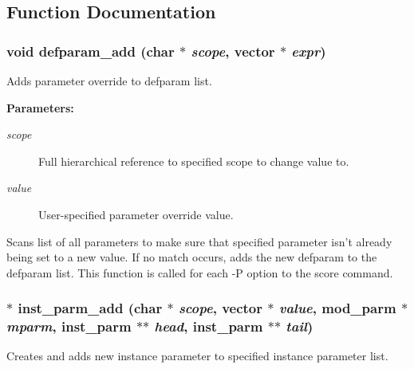 \subsection{Function Documentation}
\subsubsection{\setlength{\rightskip}{0pt plus 5cm}void defparam\_\-add (char $\ast$ {\em scope}, {\bf vector} $\ast$ {\em expr})}\label{param_8c_a10}


Adds parameter override to defparam list.

\begin{Desc}
\item[{\bf Parameters: }]\par
\begin{description}
\item[
{\em scope}]Full hierarchical reference to specified scope to change value to. \item[
{\em value}]User-specified parameter override value.

\end{description}
\end{Desc}
Scans list of all parameters to make sure that specified parameter isn't already being set to a new value. If no match occurs, adds the new defparam to the defparam list. This function is called for each -P option to the score command. 
\subsubsection{ $\ast$ inst\_\-parm\_\-add (char $\ast$ {\em scope}, {\bf vector} $\ast$ {\em value}, {\bf mod\_\-parm} $\ast$ {\em mparm}, {\bf inst\_\-parm} $\ast$$\ast$ {\em head}, {\bf inst\_\-parm} $\ast$$\ast$ {\em tail})}\label{param_8c_a9}


Creates and adds new instance parameter to specified instance parameter list.

